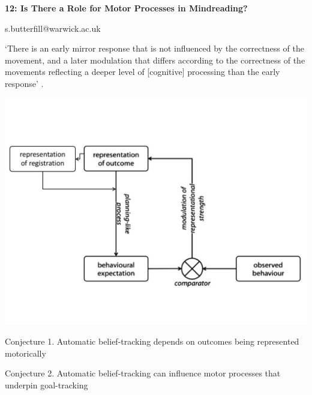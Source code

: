 \documentclass[12pt]{extarticle}
\date{}
\makeatletter
\def \ititle {Philosophical Psychology}
\def \iemail{s.butterfill@warwick.ac.uk}
\makeatother
\begin{document}
\begin{multicols*}{3}

\setlength\footnotesep{1em}








      
\def \ititle {12: Is There a Role for Motor Processes in Mindreading?}
 
\begin{center}
 
{\Large
 
\textbf{\ititle}
 
}
 
 
 
\iemail %
 
\end{center}
 
 
 
‘There is an early mirror response that is not influenced by the correctness of the movement, 
and a later modulation that differs according to the correctness of the movements reflecting a deeper 
level of [cognitive] processing than the early response’
\citep{naish:2014_effects}.

\begin{center}

  \includegraphics[scale=0.37]{fig/motor_goal_theory.jpg}
  
  \end{center}


Conjecture   1. Automatic belief-tracking depends on outcomes being represented motorically

Conjecture   2. Automatic belief-tracking can influence motor processes that underpin goal-tracking





\footnotesize


\end{multicols*}
\end{document}
